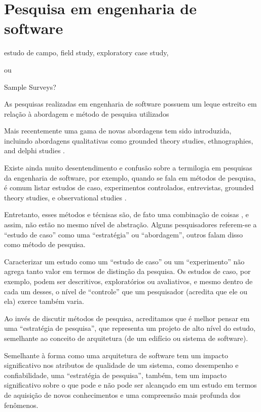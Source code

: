 \section{Pesquisa em engenharia de software}

estudo de campo, field study, exploratory case study,

ou

Sample Surveys?

As pesquisas realizadas em engenharia de software possuem um leque estreito em
relação à abordagem e método de pesquisa utilizados  \cite{glass2002research}

Mais recentemente uma gama de novas abordagens tem sido introduzida, incluindo
abordagens qualitativas como grounded theory studies, ethnographies, and delphi
studies \cite{hazzan2010qualitative}.

Existe ainda muito desentendimento e confusão sobre a termilogia em pesquisas
da engenharia de software, por exemplo, quando se fala em métodos de pesquisa,
é comum listar estudos de caso, experimentos controlados, entrevistas, grounded
theory studies, e observational studies \cite{hazzan2010qualitative}.

Entretanto, esses métodos e técnisas são, de fato uma combinação de coisas
\cite{mcgrath1981dilemmatics}, e assim, não estão no mesmo nível de abstração.
Alguns pesquisadores referem-se a ``estudo de caso'' como uma ``estratégia'' ou
``abordagem'', outros falam disso como método de pesquisa.

Caracterizar um estudo como um ``estudo de caso'' ou um ``experimento'' não
agrega tanto valor em termos de distinção da pesquisa. Os
estudos de caso, por exemplo, podem ser descritivos, exploratórios ou
avaliativos, e mesmo dentro de cada um desses, o nível de ``controle'' que um
pesquisador (acredita que ele ou ela) exerce também varia.

Ao invés de discutir
métodos de pesquisa, acreditamos que é melhor pensar em uma ``estratégia de
pesquisa'', que representa um projeto de alto nível do estudo, semelhante ao
conceito de arquitetura (de um edifício ou sistema de software).

Semelhante à
forma como uma arquitetura de software tem um impacto significativo nos
atributos de qualidade de um sistema, como desempenho e confiabilidade, uma
``estratégia de pesquisa'', também, tem um impacto significativo sobre o que pode e
não pode ser alcançado em um estudo em termos de aquisição de novos
conhecimentos e uma compreensão mais profunda dos fenômenos.

